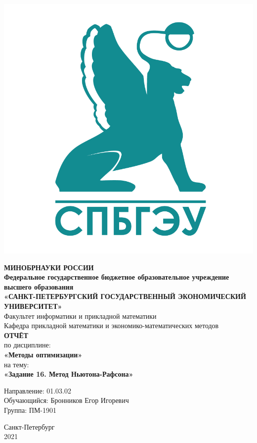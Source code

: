 \documentclass[14pt,a4paper,fleqn]{extarticle}
\begin{document}
	\begin{titlepage}
		\includegraphics[scale=0.12]{logo}
		\begin{center}
			\textbf{МИНОБРНАУКИ РОССИИ}\\
			\vspace{0.2cm}
			\textbf{Федеральное государственное бюджетное образовательное учреждение высшего образования}\\
			\textbf{«САНКТ-ПЕТЕРБУРГСКИЙ ГОСУДАРСТВЕННЫЙ ЭКОНОМИЧЕСКИЙ УНИВЕРСИТЕТ»}\\
			\vspace{0.6cm}
			Факультет информатики и прикладной математики\\
			Кафедра прикладной математики и экономико-математических методов\\
			\vspace{1cm}
			\textbf{ОТЧЁТ}\\
			по дисциплине:\\
			\textbf{«Методы оптимизации»}\\
			на тему:\\
			\textbf{«Задание 16. Метод Ньютона-Рафсона»}\\
		\end{center}
		\vspace{1cm}
		Направление: 01.03.02\\
		Обучающийся: Бронников Егор Игоревич\\
		Группа: ПМ-1901\\
		\vfill
		\begin{center}
			Санкт-Петербург\\
			2021\\
		\end{center}
	\end{titlepage}
\end{document}
